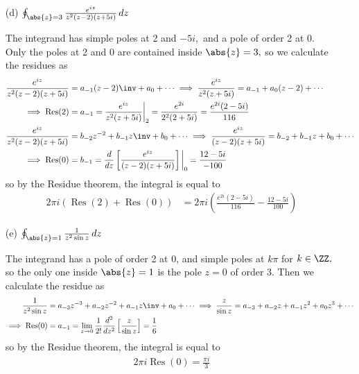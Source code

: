 \documentclass{article}
\DeclareMathOperator{\Res}{Res}
\begin{document}
\begin{itemize}
\begin{itemize}
			\item[(d)] $\oint_{\abs{z}=3} \frac{e^{iz}}{z^2(z-2)(z+5i)}\, dz$
				\begin{soln}
					The integrand has simple poles at 2 and $-5i,$ and a pole of order 2 at 0. Only the poles at 2 and 0 are contained inside $\abs{z}=3,$ so we calculate the residues as
					\begin{align*}
						\frac{e^{iz}}{z^2(z-2)(z+5i)} &= a_{-1}(z-2)\inv + a_0 + \cdots \implies \frac{e^{iz}}{z^2(z+5i)} = a_{-1} + a_0(z-2) + \cdots \\
						\implies \Res(2) &= a_{-1} = \frac{e^{iz}}{z^2(z+5i)}\bigg\vert_2 = \frac{e^{2i}}{2^2(2+5i)} = \frac{e^{2i}(2-5i)}{116} \\
						\frac{e^{iz}}{z^2(z-2)(z+5i)} &= b_{-2}z^{-2} + b_{-1}z\inv + b_0 + \cdots \implies \frac{e^{iz}}{(z-2)(z+5i)} = b_{-2} + b_{-1}z + b_0 + \cdots \\
						\implies \Res(0) &= b_{-1} = \frac{d}{dz}\left[ \frac{e^{iz}}{(z-2)(z+5i)} \right]\bigg\vert_0 = \frac{12-5i}{-100}
					\end{align*}
					so by the Residue theorem, the integral is equal to
					\begin{align*}
						2\pi i\left( \Res(2)+\Res(0) \right) &= 2\pi i\left( \frac{e^{2i}(2-5i)}{116} - \frac{12-5i}{100} \right)
					\end{align*}
				\end{soln}

			\item[(e)] $\oint_{\abs{z}=1} \frac{1}{z^2\sin z}\, dz$
				\begin{soln}
					The integrand has a pole of order 2 at 0, and simple poles at $k\pi$ for $k\in\ZZ,$ so the only one inside $\abs{z}=1$ is the pole $z=0$ of order 3. Then we calculate the residue as
					\begin{align*}
						\frac{1}{z^2\sin z} &= a_{-3}z^{-3} + a_{-2}z^{-2} + a_{-1}z\inv + a_0 + \cdots \implies \frac{z}{\sin z} = a_{-3} + a_{-2}z + a_{-1}z^2+a_0z^3+\cdots \\
						\implies \Res(0) &= a_{-1} = \lim_{z\to0}\frac{1}{2!}\frac{d^2}{dz^2}\left[ \frac{z}{\sin z} \right] = \frac{1}{6}
					\end{align*}
					so by the Residue theorem, the integral is  equal to
					\begin{align*}
						2\pi i\Res(0) = \frac{\pi i}{3}
					\end{align*}
				\end{soln}


\end{itemize}
\end{itemize}
\end{document}
